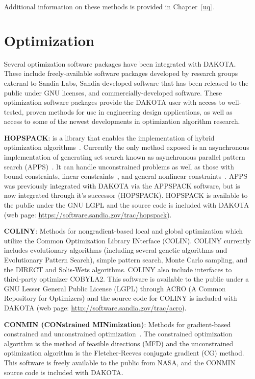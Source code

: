 Additional information on these methods is provided in Chapter~\ref{uq}.

\section{Optimization}\label{capabilities:optimization1}

Several optimization software packages have been integrated with
DAKOTA. These include freely-available software packages developed by
research groups external to Sandia Labs, Sandia-developed software
that has been released to the public under GNU licenses, and
commercially-developed software. These optimization software packages
provide the DAKOTA user with access to well-tested, proven methods for
use in engineering design applications, as well as access to some of
the newest developments in optimization algorithm research.

\textbf{HOPSPACK}: is a library that enables the implementation of
hybrid optimization algorithms~\cite{Plantenga2009}.  Currently the
only method exposed is an asynchronous implementation of generating
set search known as asynchronous parallel pattern search
(APPS)~\cite{GrKo06}.  It can handle unconstrained problems as well as
those with bound constraints, linear constraints~\cite{GrKoLe08}, and
general nonlinear constraints~\cite{GrKo07}.  APPS was previously
integrated with DAKOTA via the APPSPACK software, but is now
integrated through it's successor (HOPSPACK).  HOPSPACK is available
to the public under the GNU LGPL and the source code is included with
DAKOTA (web page: \url{https://software.sandia.gov/trac/hopspack}).

\textbf{COLINY}: Methods for nongradient-based local and global
optimization which utilize the Common Optimization Library INterface
(COLIN). %
COLINY currently includes evolutionary algorithms (including several
genetic algorithms and Evolutionary Pattern Search), simple pattern
search, Monte Carlo sampling, and the DIRECT and Solis-Wets
algorithms. COLINY also include interfaces to third-party optimizer
COBYLA2.  This software is available to the public under a GNU Lesser
General Public License (LGPL) through ACRO (A Common Repository for
Optimizers) and the source code for COLINY is included with DAKOTA
(web page: \url{http://software.sandia.gov/trac/acro}).

\textbf{CONMIN (CONstrained MINimization)}: Methods for gradient-based
constrained and unconstrained optimization~\cite{Van78}. The constrained
optimization algorithm is the method of feasible directions (MFD) and
the unconstrained optimization algorithm is the Fletcher-Reeves
conjugate gradient (CG) method. This software is freely available to
the public from NASA, and the CONMIN source code is included with
DAKOTA.

